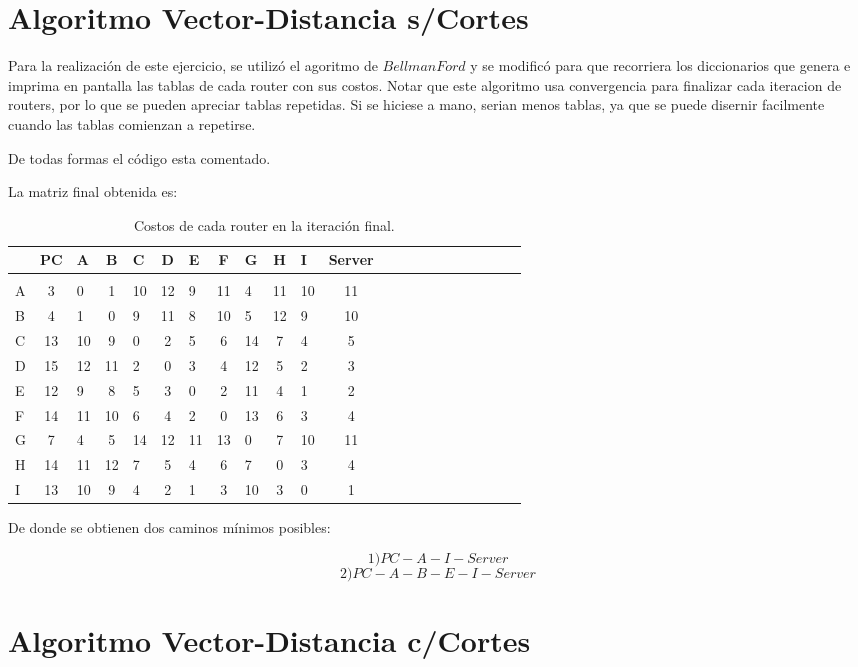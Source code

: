 \documentclass[a4papaer]{article}
\begin{document}
\section{Algoritmo Vector-Distancia s/Cortes}
 
Para la realización de este ejercicio, se utilizó el agoritmo de $Bellman Ford$ y se modificó para que recorriera los diccionarios que genera e imprima en pantalla las tablas de cada router con sus costos. Notar que este algoritmo usa convergencia para finalizar cada iteracion de routers, por lo que se pueden apreciar tablas repetidas. Si se hiciese a mano, serian menos tablas, ya que se puede disernir facilmente cuando las tablas comienzan a repetirse.

De todas formas el código esta comentado.

La matriz final obtenida es:

\begin{table}[h]
\centering
\begin{tabular}{lclclclclclclclclclclc}

& PC & A & B & C & D & E & F & G & H & I & Server \\\hline\\
A&3&0&1&10&12&9&11&4&11&10&11 \\
B&4&1&0&9&11&8&10&5&12&9&10 \\
C&13&10&9&0&2&5&6&14&7&4&5 \\
D&15&12&11&2&0&3&4&12&5&2&3 \\
E&12&9&8&5&3&0&2&11&4&1&2 \\
F&14&11&10&6&4&2&0&13&6&3&4 \\
G&7&4&5&14&12&11&13&0&7&10&11 \\
H&14&11&12&7&5&4&6&7&0&3&4 \\
I&13&10&9&4&2&1&3&10&3&0&1 \\

\end{tabular}
\caption{\label{tab:widgets}Costos de cada router en la iteración final.}
\end{table}

De donde se obtienen dos caminos mínimos posibles:

$$1) PC-A-I-Server$$
$$2) PC-A-B-E-I-Server$$

\section{Algoritmo Vector-Distancia c/Cortes}
\end{document}
